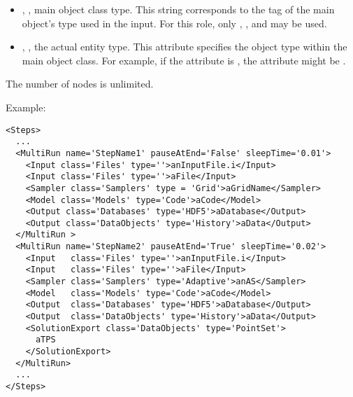 \begin{itemize}
\begin{itemize}
  \item {}, , main object class
    type.
    This string corresponds to the tag of the main object's type used in the
    input.
    For this role, only , , and 
     may be used.
  \item {}, , the actual entity
    type.
    This attribute specifies the object type within the main object class.
    For example, if the  attribute is , the
     attribute might be .
\end{itemize}
\nb The number of  nodes is unlimited.
\end{itemize}

Example:
\begin{lstlisting}[style=XML,morekeywords={pauseAtEnd,sleepTime,class}]
<Steps>
  ...
  <MultiRun name='StepName1' pauseAtEnd='False' sleepTime='0.01'>
    <Input class='Files' type=''>anInputFile.i</Input>
    <Input class='Files' type=''>aFile</Input>
    <Sampler class='Samplers' type = 'Grid'>aGridName</Sampler>
    <Model class='Models' type='Code'>aCode</Model>
    <Output class='Databases' type='HDF5'>aDatabase</Output>
    <Output class='DataObjects' type='History'>aData</Output>
  </MultiRun >
  <MultiRun name='StepName2' pauseAtEnd='True' sleepTime='0.02'>
    <Input   class='Files' type=''>anInputFile.i</Input>
    <Input   class='Files' type=''>aFile</Input>
    <Sampler class='Samplers' type='Adaptive'>anAS</Sampler>
    <Model   class='Models' type='Code'>aCode</Model>
    <Output  class='Databases' type='HDF5'>aDatabase</Output>
    <Output  class='DataObjects' type='History'>aData</Output>
    <SolutionExport class='DataObjects' type='PointSet'>
      aTPS
    </SolutionExport>
  </MultiRun>
  ...
</Steps>
\end{lstlisting}

